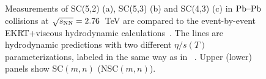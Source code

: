 \begin{figure}[!]
\begin{center}
              \end{center}
        \caption{Measurements of  SC(5,2) (a), SC(5,3) (b) and SC(4,3) (c) in $\textnormal{Pb--Pb}$ collisions at $\sqrt{s_{\textnormal{NN}}}=2.76$~TeV are compared to the event-by-event EKRT+viscous hydrodynamic calculations~\cite{Niemi:2015qia}. The lines are hydrodynamic predictions with two different $\eta/s(T)$ parameterizations, labeled in the same way as in ~\cite{Niemi:2015qia}. Upper (lower) panels show SC$(m,n)$ (NSC$(m,n)$).}        
        \label{fig:Figure_5}
\end{figure}


